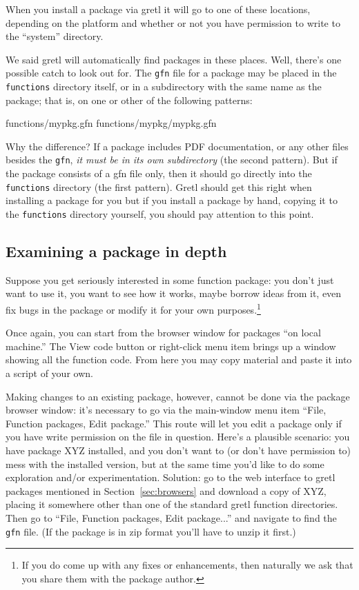 \documentclass[oneside]{book}
\begin{document}
When you install a package via gretl it will go to one of these
locations, depending on the platform and whether or not you have
permission to write to the ``system'' directory.

We said gretl will automatically find packages in these places. Well,
there's one possible catch to look out for. The \texttt{gfn} file for
a package may be placed in the \texttt{functions} directory itself, or
in a subdirectory with the same name as the package; that is, on one
or other of the following patterns:
%
\begin{code}
functions/mypkg.gfn
functions/mypkg/mypkg.gfn
\end{code}
%
Why the difference? If a package includes PDF documentation, or any
other files besides the \texttt{gfn}, \textit{it must be in its own
  subdirectory} (the second pattern). But if the package consists of a
gfn file only, then it should go directly into the \texttt{functions}
directory (the first pattern).  Gretl should get this right when
installing a package for you but if you install a package by hand,
copying it to the \texttt{functions} directory yourself, you should
pay attention to this point.

\subsection{Examining a package in depth}

Suppose you get seriously interested in some function package: you
don't just want to use it, you want to see how it works, maybe borrow
ideas from it, even fix bugs in the package or modify it for your own
purposes.\footnote{If you do come up with any fixes or enhancements,
  then naturally we ask that you share them with the package author.}

Once again, you can start from the browser window for packages ``on
local machine.'' The \textsf{View code} button or right-click menu
item brings up a window showing all the function code. From here
you may copy material and paste it into a script of your own.

Making changes to an existing package, however, cannot be done via the
package browser window: it's necessary to go via the main-window menu
item ``File, Function packages, Edit package.'' This route will let
you edit a package only if you have write permission on the file in
question.  Here's a plausible scenario: you have package \textsf{XYZ}
installed, and you don't want to (or don't have permission to) mess
with the installed version, but at the same time you'd like to do some
exploration and/or experimentation. Solution: go to the web interface
to gretl packages mentioned in Section~\ref{sec:browsers} and download
a copy of \textsf{XYZ}, placing it somewhere other than one of the
standard gretl function directories. Then go to ``File, Function
packages, Edit package...'' and navigate to find the \texttt{gfn}
file. (If the package is in zip format you'll have to unzip it first.)
\end{document}

